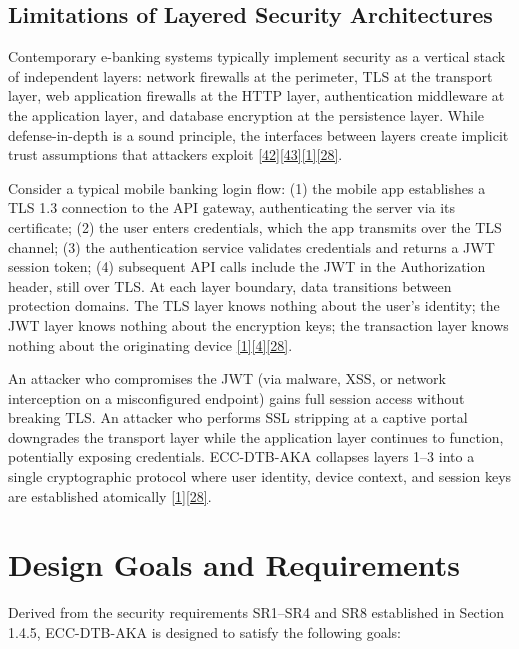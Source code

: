 \subsection{Limitations of Layered Security Architectures}

\indent Contemporary e-banking systems typically implement security as a vertical stack of independent layers: network firewalls at the perimeter, TLS at the transport layer, web application firewalls at the HTTP layer, authentication middleware at the application layer, and database encryption at the persistence layer. While defense-in-depth is a sound principle, the interfaces between layers create implicit trust assumptions that attackers exploit \hyperref[ref:42]{[42]}\hyperref[ref:43]{[43]}\hyperref[ref:1]{[1]}\hyperref[ref:28]{[28]}.

\indent Consider a typical mobile banking login flow: (1) the mobile app establishes a TLS 1.3 connection to the API gateway, authenticating the server via its certificate; (2) the user enters credentials, which the app transmits over the TLS channel; (3) the authentication service validates credentials and returns a JWT session token; (4) subsequent API calls include the JWT in the Authorization header, still over TLS. At each layer boundary, data transitions between protection domains. The TLS layer knows nothing about the user's identity; the JWT layer knows nothing about the encryption keys; the transaction layer knows nothing about the originating device \hyperref[ref:1]{[1]}\hyperref[ref:4]{[4]}\hyperref[ref:28]{[28]}.

\indent An attacker who compromises the JWT (via malware, XSS, or network interception on a misconfigured endpoint) gains full session access without breaking TLS. An attacker who performs SSL stripping at a captive portal downgrades the transport layer while the application layer continues to function, potentially exposing credentials. ECC-DTB-AKA collapses layers 1--3 into a single cryptographic protocol where user identity, device context, and session keys are established atomically \hyperref[ref:1]{[1]}\hyperref[ref:28]{[28]}.

\section{Design Goals and Requirements}

\indent Derived from the security requirements SR1--SR4 and SR8 established in Section 1.4.5, ECC-DTB-AKA is designed to satisfy the following goals:

